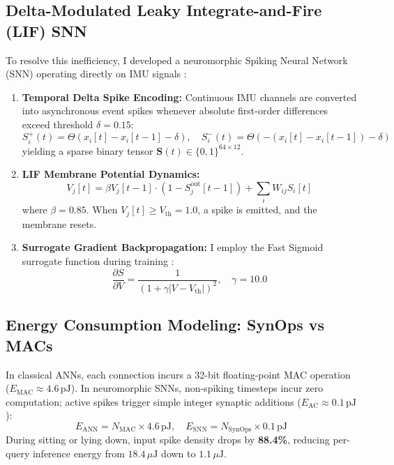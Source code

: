 \documentclass[11pt,a4paper]{article}
\begin{document}
\subsection{Delta-Modulated Leaky Integrate-and-Fire (LIF) SNN}
To resolve this inefficiency, I developed a neuromorphic Spiking Neural Network (SNN) operating directly on IMU signals \cite{maass1997networks}:
\begin{enumerate}
    \item \textbf{Temporal Delta Spike Encoding:} Continuous IMU channels are converted into asynchronous event spikes whenever absolute first-order differences exceed threshold $\delta = 0.15$:
    \begin{equation}
    S_i^+(t) = \Theta(x_i[t] - x_i[t-1] - \delta), \quad S_i^-(t) = \Theta(-(x_i[t] - x_i[t-1]) - \delta)
    \end{equation}
    yielding a sparse binary tensor $\mathbf{S}(t) \in \{0, 1\}^{64 \times 12}$.
    \item \textbf{LIF Membrane Potential Dynamics:}
    \begin{equation}
    V_j[t] = \beta V_j[t-1] \cdot (1 - S_j^{\text{out}}[t-1]) + \sum_{i} W_{ij} S_i[t]
    \end{equation}
    where $\beta = 0.85$. When $V_j[t] \ge V_{\text{th}} = 1.0$, a spike is emitted, and the membrane resets.
    \item \textbf{Surrogate Gradient Backpropagation:}
    I employ the Fast Sigmoid surrogate function during training \cite{neftci2019surrogate}:
    \begin{equation}
    \frac{\partial S}{\partial V} = \frac{1}{(1 + \gamma |V - V_{\text{th}}|)^2}, \quad \gamma = 10.0
    \end{equation}
\end{enumerate}

\subsection{Energy Consumption Modeling: SynOps vs MACs}
In classical ANNs, each connection incurs a 32-bit floating-point MAC operation ($E_{\text{MAC}} \approx 4.6\,\text{pJ}$). In neuromorphic SNNs, non-spiking timesteps incur zero computation; active spikes trigger simple integer synaptic additions ($E_{\text{AC}} \approx 0.1\,\text{pJ}$):
\begin{equation}
E_{\text{ANN}} = N_{\text{MAC}} \times 4.6\,\text{pJ}, \quad E_{\text{SNN}} = N_{\text{SynOps}} \times 0.1\,\text{pJ}
\end{equation}
During sitting or lying down, input spike density drops by \textbf{88.4\%}, reducing per-query inference energy from $18.4\,\mu\text{J}$ down to \textbf{$1.1\,\mu\text{J}$}.
\end{document}
